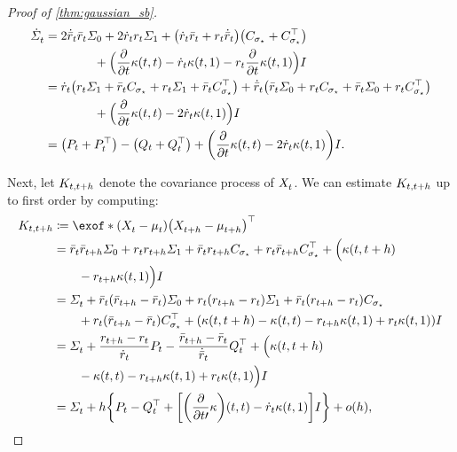 \begin{proof}[Proof of \cref{thm:gaussian_sb}]
\begin{align}
\nn
\dSigmasol &= 2 \dratioc\ratioc \covar + 2 \dratio\ratio \covaralt + \parens*{  \dratio\ratioc + \ratio\dratioc } \parens*{ \Cs + \Cs^\top} \\
\nn
&\qquad\qquad+ \Big(  \frac{\del}{\del \ctime} \kernel[\ctime][\ctime] - \dratio \kernel[\ctime][\horizon] - \ratio \frac{\del}{\del \ctime} \kernel[\ctime][\horizon]  \Big)\eye \\
\nn
&= \dratio \parens*{   \ratio \covaralt + \ratioc \Cs + \ratio \covaralt + \ratioc \Cs^\top  } + \dratioc \parens*{   \ratioc \covar + \ratio \Cs + \ratioc \covar + \ratio \Cs^\top  } \\
\nn
&\qquad\qquad+ \Big(  \frac{\del}{\del \ctime} \kernel[\ctime][\ctime] -2 \dratio \kernel[\ctime][\horizon]  \Big)\eye\\
\label{eq:dsigmasol}
&= \parens*{ \Pt + \Pt^\top } - \parens*{ \Qt + \Qt^\top } + \parens*{  \frac{\del}{\del \ctime} \kernel[\ctime][\ctime] -2 \dratio \kernel[\ctime][\horizon]  }\eye.
\end{align}


Next, let $K_{t,t + h}$ denote the covariance process of $X^{}_{ t }$. We can estimate $K_{t,t + h}$ up to first order by computing:
\begin{align}
\nn
K_{\ctime, \ctime + h} &\defeq \exof*{  \parens*{\Xsol-\meansol} \parens*{\Xsol[\ctime+h]-\meansol[\ctime+h]}^\top   } \\
\nn
&=  \ratioc\ratioc[\ctime+h] \covar + \ratio \ratio[\ctime+h] \covaralt + \ratioc \ratio[\ctime+h] \Cs + \ratio\ratioc[\ctime+h]\Cs^\top 
+ \Big( \kernel[\ctime][\ctime+h] \\
\nn
&\qquad- \ratio[\ctime+h] \kernel[\ctime][\horizon] \Big) \eye \\
\nn
&= \Sigmasol + \ratioc(\ratioc[\ctime+h]-\ratioc) \covar + \ratio(\ratio[\ctime+h] - \ratio) \covaralt + \ratioc(\ratio[\ctime+h] - \ratio) \Cs \\
\nn
&\qquad+ \ratio( \ratioc[\ctime+h] -\ratioc) \Cs^\top + \parens*{ \kernel[\ctime][\ctime+h] - \kernel[\ctime][\ctime] - \ratio[\ctime+h] \kernel[\ctime][\horizon] + \ratio\kernel[\ctime][\horizon] }\eye \\
\nn
&= \Sigmasol + \frac{\ratio[\ctime+h] - \ratio}{\dratio} \Pt - \frac{\ratioc[\ctime+h] - \ratioc}{\dratioc} \Qt^\top + \Big( \kernel[\ctime][\ctime+h] \\
\nn
&\qquad- \kernel[\ctime][\ctime] - \ratio[\ctime+h] \kernel[\ctime][\horizon] + \ratio\kernel[\ctime][\horizon] \Big)\eye \\
\label{eq:hold5}
&= \Sigmasol + h \braces*{  \Pt - \Qt^\top +  \bracks*{ \parens*{\frac{\del}{\del \ctime\prime}\kernelbase }(\ctime, \ctime) - \dratio \kernel[\ctime][\horizon] } \eye } + o(h),
\end{align}


\end{proof}

